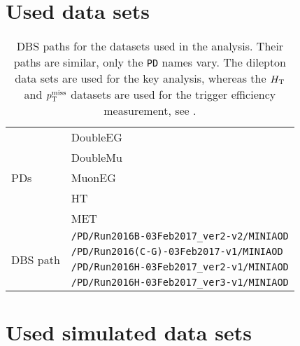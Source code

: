 \chapter{Used data sets}


\begin{table}[htb]
 \centering
 \caption{DBS paths for the datasets used in the analysis. Their paths are similar, only the \texttt{PD} names vary. The dilepton data sets are used for the key analysis, whereas the $H_{\mathrm{T}}$ and $p_{\mathrm{T}}^\text{miss}$ datasets are used for the trigger efficiency measurement, see .}
 \label{tab:app_datasets}
 \begin{tabular}{l|l}
  \hline
  \multirow{5}{*}{PDs}       & DoubleEG               \\
                             & DoubleMu               \\
                             & MuonEG                 \\
                             & HT                     \\
                             & MET                    \\\hline\hline
  \multirow{ 4}{*}{DBS path} & \verb|/PD/Run2016B-03Feb2017_ver2-v2/MINIAOD| \\
                             & \verb|/PD/Run2016(C-G)-03Feb2017-v1/MINIAOD| \\
                             & \verb|/PD/Run2016H-03Feb2017_ver2-v1/MINIAOD| \\
                             & \verb|/PD/Run2016H-03Feb2017_ver3-v1/MINIAOD| \\
  \hline
 \end{tabular}
\end{table}

\chapter{Used simulated data sets}
